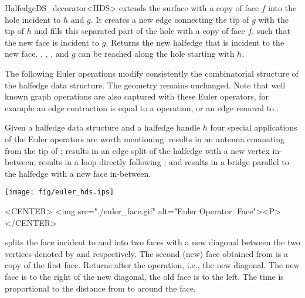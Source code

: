 \begin{ccRefClass}{HalfedgeDS_decorator<HDS>}
   {extends the surface with a copy of face $f$ into the hole 
    incident to $h$ and $g$. It creates a new edge connecting the tip of
    $g$ with the tip of $h$ and fills this separated part of the hole with a
    copy of face $f$, such that the new face is incident to $g$. Returns 
    the new halfedge that is incident to the new face.
    \ccPrecond {}, ,
    ,  and $g$ can be reached 
    along the hole starting with $h$.}



The following Euler operations modify consistently the combinatorial
structure of the halfedge data structure. The geometry remains unchanged.
Note that well known graph operations are also captured with these 
Euler operators, for example an edge contraction is equal to a
 operation, or an edge removal to .

Given a halfedge data structure  and a halfedge handle $h$
four special applications of the Euler operators are worth mentioning:
 results in an antenna emanating from the tip
of ;
 results in an edge split
of the halfedge  with a new vertex in-between;
 results in a loop directly following ;
and  results in a bridge parallel to
the halfedge  with a new face in-between.

\begin{ccTexOnly}
    \begin{center}
      \parbox{\textwidth}{%
          \texttt{[image: fig/euler\_hds.ips]}%
      }
    \end{center}
\end{ccTexOnly}

\begin{ccHtmlOnly}
    <CENTER>
    <img src="./euler_face.gif" alt="Euler Operator: Face"><P>
    </CENTER>
\end{ccHtmlOnly}

    {splits the face incident to  and  into two faces
     with a new diagonal between the two vertices denoted by  and
      respectively. The second (new) face obtained from
      is a copy of the first face. Returns  after the
     operation, i.e., the new diagonal. The new face is to the right of the 
     new diagonal, the old face is to the left. The time is proportional 
     to the distance from  to  around the face.} 


\end{ccRefClass}
